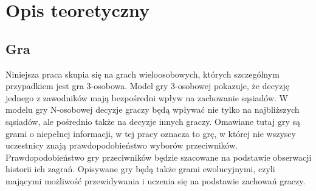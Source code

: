 \chapter{Opis teoretyczny}
\label{cha:opis_teor}

\section{Gra}
\label{sec:gra}
Niniejsza praca skupia się na grach wieloosobowych, których szczególnym przypadkiem jest gra 3-osobowa. Model gry 3-osobowej pokazuje, że decyzję jednego z zawodników mają bezpośredni wpływ na zachowanie sąsiadów. W modelu gry N-osobowej decyzje graczy będą wpływać nie tylko na najbliższych sąsiadów, ale pośrednio także na decyzje innych graczy.
Omawiane tutaj gry są grami o niepełnej informacji, w tej pracy oznacza to grę, w której nie wszyscy uczestnicy znają prawdopodobieństwo wyborów przeciwników. Prawdopodobieństwo gry przeciwników będzie szacowane na podstawie obserwacji historii ich zagrań.
Opisywane gry będą także grami ewolucyjnymi, czyli mającymi możliwość przewidywania i uczenia się na podstawie zachowań graczy.

